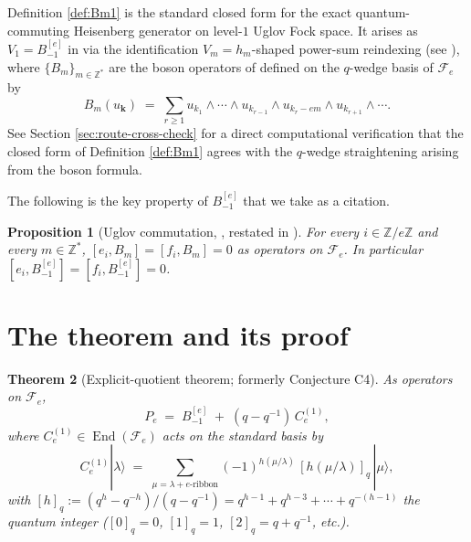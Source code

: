 \documentclass[11pt]{article}
\newtheorem{theorem}{Theorem}
\newtheorem{proposition}[theorem]{Proposition}
\theoremstyle{definition}
\newcommand{\Fock}{\mathcal{F}}
\newcommand{\Ce}{C_e^{(1)}}
\newcommand{\Bmi}{B_{-1}^{[e]}}
\begin{document}
Definition \ref{def:Bm1} is the standard closed form for the exact
quantum-commuting Heisenberg generator on level-$1$ Uglov Fock space. It
arises as $V_1 = \Bmi$ in \cite[Thm.\ 7.13]{LT96} via the identification
$V_m = h_m$-shaped power-sum reindexing (see \cite[eq.\ (18) and Thm.\ 3.2]{Iij12}),
where $\{B_m\}_{m \in \mathbb Z^*}$ are the boson operators of
\cite[Prop.\ 4.5]{Ugl00} defined on the $q$-wedge basis of $\Fock_e$ by
\begin{equation}
    B_m(u_{\boldsymbol k}) \;=\; \sum_{r \ge 1} u_{k_1} \wedge \cdots \wedge u_{k_{r-1}} \wedge u_{k_r - e m} \wedge u_{k_{r+1}} \wedge \cdots. \tag{Iij12 eq.\ (9), $\ell=1$}
\end{equation}
See Section \ref{sec:route-cross-check} for a direct computational verification
that the closed form of Definition \ref{def:Bm1} agrees with the $q$-wedge
straightening arising from the boson formula.

The following is the key property of $\Bmi$ that we take as a citation.

\begin{proposition}[Uglov commutation, {\cite[Prop.\ 5.1]{Ugl00}}, restated in {\cite[\S 2]{Iij12}}]
\label{prop:uglov-commutation}
For every $i \in \mathbb Z/e\mathbb Z$ and every $m \in \mathbb Z^*$,
$[e_i, B_m] = [f_i, B_m] = 0$ as operators on $\Fock_e$. In particular
$[e_i, \Bmi] = [f_i, \Bmi] = 0$.
\end{proposition}

\section{The theorem and its proof}
\label{sec:theorem}

\begin{theorem}[Explicit-quotient theorem; formerly Conjecture C4]
\label{thm:C4-explicit}
As operators on $\Fock_e$,
\begin{equation}
    P_e \;=\; \Bmi \;+\; (q - q^{-1}) \, \Ce,
    \label{eq:main-decomposition}
\end{equation}
where $\Ce \in \operatorname{End}(\Fock_e)$ acts on the standard basis by
\begin{equation}
    \Ce |\lambda\rangle \;=\; \sum_{\mu = \lambda + e\text{-ribbon}} (-1)^{h(\mu/\lambda)} \, [h(\mu/\lambda)]_q \, |\mu\rangle,
    \label{eq:C1-explicit}
\end{equation}
with $[h]_q := (q^h - q^{-h})/(q - q^{-1}) = q^{h-1} + q^{h-3} + \cdots + q^{-(h-1)}$
the quantum integer ($[0]_q = 0$, $[1]_q = 1$, $[2]_q = q + q^{-1}$, etc.).
\end{theorem}
\end{document}
